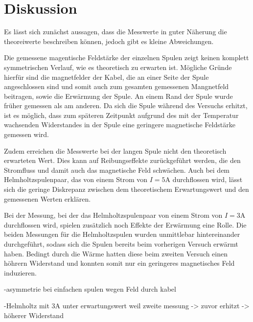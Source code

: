 \section{Diskussion}
\label{sec:Diskussion}
Es lässt sich zunächst aussagen, dass die Messwerte in guter Näherung die theoreiwerte
beschreiben können, jedoch gibt es kleine Abweichungen.

Die gemessene magentische Feldstärke der einzelnen Spulen zeigt keinen komplett
symmetrischen Verlauf, wie es theoretisch zu erwarten ist. Mögliche Gründe hierfür sind
die magnetfelder der Kabel, die an einer Seite der Spule angeschlossen sind und somit
auch zum gesamten gemessenen Mangnetfeld beitragen, sowie die Erwärmung der Spule.
An einem Rand der Spule wurde früher gemessen als am anderen. Da sich die Spule
während des Versuchs erhitzt, ist es möglich, dass zum späteren Zeitpunkt aufgrund des
mit der Temperatur wachsenden Widerstandes in der Spule eine geringere magnetische
Feldstärke gemessen wird.

Zudem erreichen die Messwerte bei der langen Spule nicht den theoretisch erwarteten
Wert. Dies kann auf Reibungseffekte zurückgeführt werden, die den Stromfluss und damit
auch das magnetische Feld schwächen. Auch bei dem Helmholtzspulenpaar, das von einem
Strom von $I=5$A durchflossen wird, lässt sich die geringe Diskrepanz zwischen dem
theoretischem Erwartungswert und den gemessenen Werten erklären.

Bei der Messung, bei der das Helmholtzspulenpaar von einem Strom von $I=3$A durchflossen
wird, spielen zusätzlich noch Effekte der Erwärmung eine Rolle. Die beiden Messungen
für die Helmholtzspulen wurden unmittlebar hintereinander durchgeführt, sodass sich die
Spulen bereits beim vorherigen Versuch erwärmt haben. Bedingt durch die Wärme
hatten diese beim zweiten Versuch einen höhrern Widerstand und konnten somit nur ein
geringeres magnetisches Feld induzieren.







-asymmetrie bei einfachen spulen wegen Feld durch kabel

-Helmholtz mit 3A unter erwartungswert weil zweite messung -> zuvor erhitzt ->
höherer Widerstand
